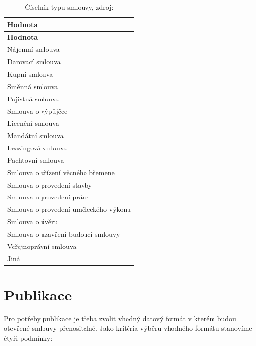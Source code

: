 \begin{center}
\centering
\begin{longtable}[c]{l}
\label{grid_mlmmh} \\
\multicolumn{1}{l}{\textbf{Hodnota}} \\ \hline 
\endfirsthead
\multicolumn{1}{l}{\textbf{Hodnota}} \\ \hline 
\hline
\endhead
\endfoot
\caption{Číselník typu smlouvy, zdroj:\protect\cite{metodika}}
\endlastfoot
\rowcolor{validateB}Nájemní smlouva \\
\rowcolor{validateB}Darovací smlouva \\
\rowcolor{validateB}Kupní smlouva \\
\rowcolor{validateB}Směnná smlouva \\
\rowcolor{validateB}Pojistná smlouva \\
\rowcolor{validateB}Smlouva o výpůjčce \\
\rowcolor{validateB}Licenční smlouva \\
\rowcolor{validateB}Mandátní smlouva \\
\rowcolor{validateB}Leasingová smlouva \\
\rowcolor{validateB}Pachtovní smlouva \\
\rowcolor{validateB}Smlouva o zřízení věcného břemene \\
\rowcolor{validateB}Smlouva o provedení stavby \\
\rowcolor{validateB}Smlouva o provedení práce \\
\rowcolor{validateB}Smlouva o provedení uměleckého výkonu \\
\rowcolor{validateB}Smlouva o úvěru \\
\rowcolor{validateB}Smlouva o uzavření budoucí smlouvy \\
\rowcolor{validateB}Veřejnoprávní smlouva \\
\rowcolor{validateB}Jiná \\
\end{longtable}
\end{center}

\newpage

\section{Publikace}

Pro potřeby publikace je třeba zvolit vhodný datový formát v kterém budou otevřené smlouvy přenositelné. Jako kritéria výběru vhodného formátu stanovíme čtyři podmínky:

